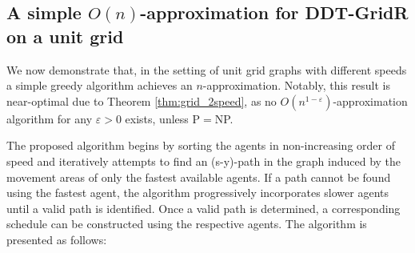

\subsection*{A simple $O(n)$-approximation for DDT-GridR on a unit grid}
We now demonstrate that, in the setting of %
unit grid graphs with different speeds a simple greedy algorithm achieves an \( n \)-approximation. Notably, this result is near-optimal due to Theorem \ref{thm:grid_2speed}, as no $O(n^{1-\varepsilon})$-approximation algorithm for any $\varepsilon > 0$ exists, unless P$=$NP. 
%
%

The proposed algorithm begins by sorting the agents in non-increasing order of speed and iteratively attempts to find an (s-y)-path in the graph induced by the movement areas of only the fastest available agents. 
If a path cannot be found using the fastest agent, the algorithm progressively incorporates slower agents until a valid path is identified. Once a valid path is determined, a corresponding schedule can be constructed using the respective agents. 
The algorithm is presented as follows:


